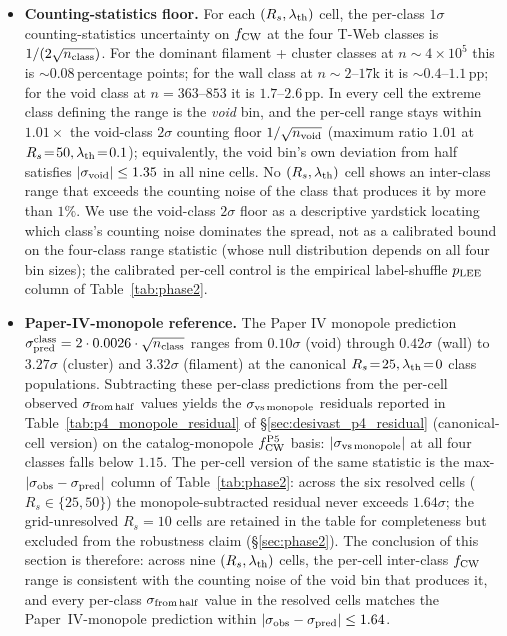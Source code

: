 \documentclass[twocolumn,linenumbers]{aastex702}
\begin{document}
\begin{itemize}
\item \textbf{Counting-statistics floor.} For each $(R_s,
\lambda_{\rm th})$ cell, the per-class $1\sigma$ counting-statistics
uncertainty on $f_{\rm CW}$ at the four T-Web classes is
$1/(2\sqrt{n_{\rm class}})$. For the dominant filament + cluster
classes at $n \sim 4 \times 10^5$ this is
$\sim 0.08$\,percentage points; for the wall class at
$n \sim 2$--$17$k it is $\sim 0.4$--$1.1$\,pp; for the void class at
$n = 363$--$853$ it is
$1.7$--$2.6$\,pp. In every cell the extreme class defining the range
is the \emph{void} bin, and the per-cell range stays within
$1.01\times$ the void-class $2\sigma$ counting floor
$1/\sqrt{n_{\rm void}}$ (maximum
ratio $1.01$ at $R_s\!=\!50, \lambda_{\rm th}\!=\!0.1$); equivalently,
the void bin's own deviation from half satisfies
$|\sigma_{\rm void}| \le 1.35$ in all nine cells. No
$(R_s, \lambda_{\rm th})$ cell shows an
inter-class range that exceeds the counting noise of the class that
produces it by more than $1\%$. We use the void-class $2\sigma$ floor
as a descriptive yardstick locating which class's counting noise
dominates the spread, not as a calibrated bound on the four-class
range statistic (whose null distribution depends on all four bin
sizes); the calibrated per-cell control is the empirical
label-shuffle $p_{\rm LEE}$ column of Table~\ref{tab:phase2}.

\item \textbf{Paper-IV-monopole reference.} The Paper IV
monopole prediction $\sigma_{\rm pred}^{\rm class} = 2 \cdot 0.0026
\cdot \sqrt{n_{\rm class}}$ ranges from $0.10\sigma$ (void) through
$0.42\sigma$ (wall) to $3.27\sigma$ (cluster) and $3.32\sigma$
(filament) at the canonical $R_s\!=\!25, \lambda_{\rm th}\!=\!0$
class populations. Subtracting these per-class predictions from the
per-cell observed $\sigma_{\rm from\,half}$ values yields the
$\sigma_{\rm vs\,monopole}$ residuals reported in
Table~\ref{tab:p4_monopole_residual} of \S\ref{sec:desivast_p4_residual}
(canonical-cell version) on the catalog-monopole $f_{\rm CW}^{\rm P5}$
basis: $|\sigma_{\rm vs\,monopole}|$ at all four classes falls
below $1.15$. The per-cell version of the same statistic is the
max-$|\sigma_{\rm obs}-\sigma_{\rm pred}|$ column of
Table~\ref{tab:phase2}: across the six resolved cells ($R_s \in
\{25, 50\}$) the
monopole-subtracted residual never exceeds $1.64\sigma$; the
grid-unresolved $R_s\!=\!10$ cells are retained in the table for
completeness but excluded from the robustness claim
(\S\ref{sec:phase2}). The conclusion of
this section is therefore: across nine $(R_s, \lambda_{\rm th})$
cells, the per-cell inter-class $f_{\rm CW}$ range is consistent with
the counting noise of the void bin that produces it, and every
per-class
$\sigma_{\rm from\,half}$ value in the resolved cells matches the Paper~IV-monopole
prediction within
$|\sigma_{\rm obs}-\sigma_{\rm pred}| \le 1.64$.


\end{itemize}
\end{document}
